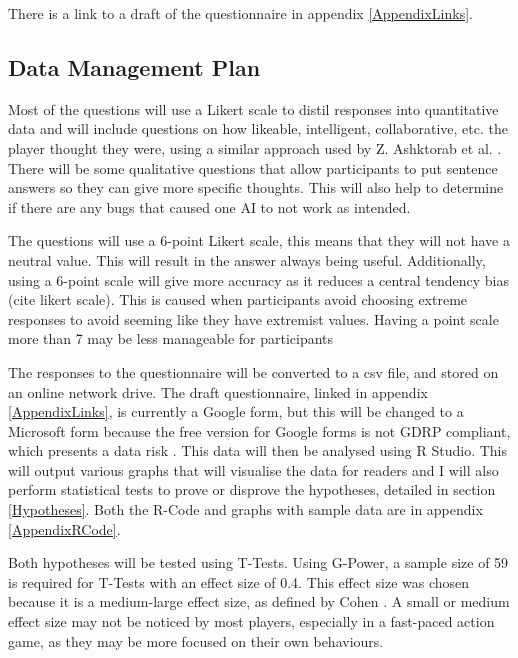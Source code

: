 \documentclass{IEEEtran}
\begin{document}
There is a link to a draft of the questionnaire in appendix \ref{AppendixLinks}.

\subsection{Data Management Plan}
\label{DataManagement}

Most of the questions will use a Likert scale to distil responses into quantitative data and will include questions on how likeable, intelligent, collaborative, etc. the player thought they were, using a similar approach used by Z. Ashktorab et al. \cite{SocialPerceptions2020}. There will be some qualitative questions that allow participants to put sentence answers so they can give more specific thoughts. This will also help to determine if there are any bugs that caused one AI to not work as intended.

The questions will use a 6-point Likert scale, this means that they will not have a neutral value. This will result in the answer always being useful. Additionally, using a 6-point scale will give more accuracy as it reduces a central tendency bias (cite likert scale). This is caused when participants avoid choosing extreme responses to avoid seeming like they have extremist values. Having a point scale more than 7 may be less manageable for participants

The responses to the questionnaire will be converted to a csv file, and stored on an online network drive. The draft questionnaire, linked in appendix \ref{AppendixLinks}, is currently a Google form, but this will be changed to a Microsoft form because the free version for Google forms is not GDRP compliant, which presents a data risk \cite{GoogleFormsGDRP}. This data will then be analysed using R Studio. This will output various graphs that will visualise the data for readers and I will also perform statistical tests to prove or disprove the hypotheses, detailed in section \ref{Hypotheses}. Both the R-Code and graphs with sample data are in appendix \ref{AppendixRCode}.

Both hypotheses will be tested using T-Tests. Using G-Power, a sample size of 59 is required for T-Tests with an effect size of 0.4. This effect size was chosen because it is a medium-large effect size, as defined by Cohen \cite{cohen1988statistical}. A small or medium effect size may not be noticed by most players, especially in a fast-paced action game, as they may be more focused on their own behaviours.
\end{document}
